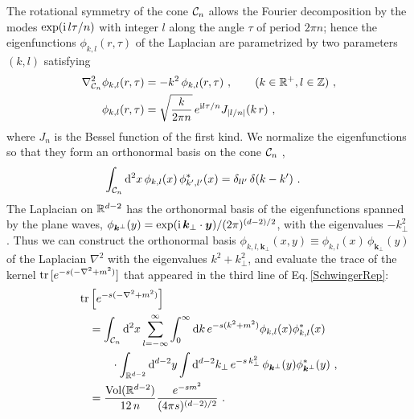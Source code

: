 The rotational symmetry of the cone ${\cal C}_n$ allows the Fourier decomposition by the modes $\exp (\mathrm{i}\, l \tau/n)$ with integer $l$ along the angle $\tau$ of period $2\pi n$; hence the eigenfunctions $\phi_{k,l}(r,\tau)$ of the Laplacian are parametrized by two parameters $(k, l)$ satisfying
\begin{align}
\begin{aligned}
\nabla^2_{\CC_n} \phi_{k,l}(r,\tau) &= - k^2 \,\phi_{k,l}(r,\tau) \ , \qquad (k\in \BR^+, l\in \BZ) \ , \\
\phi_{k,l}(r,\tau) &= \sqrt{\frac{k}{2\pi n}} \, e^{\i l \tau/n} J_{\left| l/n\right|} (k\,r) \ , 
\end{aligned}
\end{align}
where $J_n$ is the Bessel function of the first kind.
We normalize the eigenfunctions so that they form an orthonormal basis on the cone ${\cal C}_n$ \cite{Kabat:1995eq},
\begin{align}
\int_{{\cal C}_n} \mathrm{d}^2 x\, \phi_{k,l}(x)\, \phi_{k',l'}^\ast (x) &= \delta_{l l'}\, \delta (k - k') \ .
\end{align}
The Laplacian on $\mathbb{R}^{d-2}$ has the orthonormal basis of the eigenfunctions spanned by the plane waves, $\phi_{{\bm k}^\perp} (y) = \exp (\mathrm{i}\, {\bm k}_\perp \cdot {\bm y}) / (2\pi)^{(d-2)/2}$, with the eigenvalues $-k_\perp^2$.
Thus we can construct the orthonormal basis $\phi_{k,l,{\bm k}_\perp} (x,y) \equiv \phi_{k,l}(x)\, \phi_{{\bm k}_\perp}(y)$ of the Laplacian $\nabla^2$ with the eigenvalues $k^2 + k_\perp^2$, and evaluate the trace of the kernel ${\rm tr}\,[e^{-s (-\nabla^2 + m^2)}]$ that appeared in the third line of Eq.\,\eqref{SchwingerRep}:
\begin{align}\label{SLTrace}
\begin{aligned}
{\rm tr} &\left[e^{-s (-\nabla^2 + m^2)}\right] \\
	&= \int_{{\cal C}_n} \mathrm{d}^2 x \sum_{l=-\infty}^\infty \int_0^\infty \mathrm{d} k \, e^{-s(k^2 + m^2)} \phi_{k,l}(x)\phi_{k,l}^\ast (x) \\	
		&\qquad \cdot \int_{\mathbb{R}^{d-2}} \mathrm{d}^{d-2} y \int \mathrm{d}^{d-2}k_\perp \, e^{-s\, k_\perp^2} \, \phi_{{\bm k}^\perp} (y)\phi_{{\bm k}^\perp}^\ast (y) \ ,\\
	&= \frac{\text{Vol}(\mathbb{R}^{d-2})}{12\, n} \frac{e^{-s m^2}}{(4\pi s)^{(d-2)/2}} \ .
\end{aligned}
\end{align}

